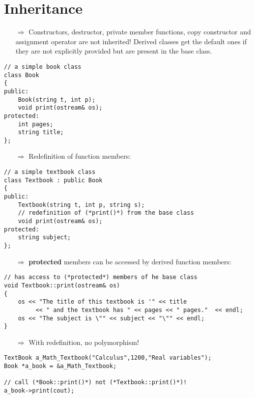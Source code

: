 \documentclass[10pt]{article}
\begin{document}
\section{Inheritance}
\small
\begin{enumerate}
\item[$\Rightarrow$] Constructors, destructor, private member functions, copy constructor
and assignment operator are not inherited! Derived classes get the default ones
if they are not explicitly provided but are present in the base class.
\end{enumerate}
\begin{lstlisting}
// a simple book class
class Book
{
public:
    Book(string t, int p);
    void print(ostream& os);
protected:
    int pages;
    string title;
};
\end{lstlisting}
\begin{enumerate}
\item[$\Rightarrow$] Redefinition of function members:
\end{enumerate}
\begin{lstlisting}
// a simple textbook class
class Textbook : public Book
{
public:
    Textbook(string t, int p, string s);
    // redefinition of (*print()*) from the base class
    void print(ostream& os);
protected:
    string subject;
};
\end{lstlisting}
\begin{enumerate}
\item[$\Rightarrow$] \textbf{protected} members can be accessed
by derived function members:
\end{enumerate}
\begin{lstlisting}
// has access to (*protected*) members of he base class
void Textbook::print(ostream& os)
{
    os << "The title of this textbook is '" << title
         << " and the textbook has " << pages << " pages."  << endl;
    os << "The subject is \"" << subject << "\"" << endl;
}
\end{lstlisting}
\begin{enumerate}
\item[$\Rightarrow$] With redefinition, no polymorphism!
\end{enumerate}
\begin{lstlisting}
TextBook a_Math_Textbook("Calculus",1200,"Real variables");
Book *a_book = &a_Math_Textbook;

// call (*Book::print()*) not (*Textbook::print()*)!
a_book->print(cout);
\end{lstlisting}
%
%
\end{document}
